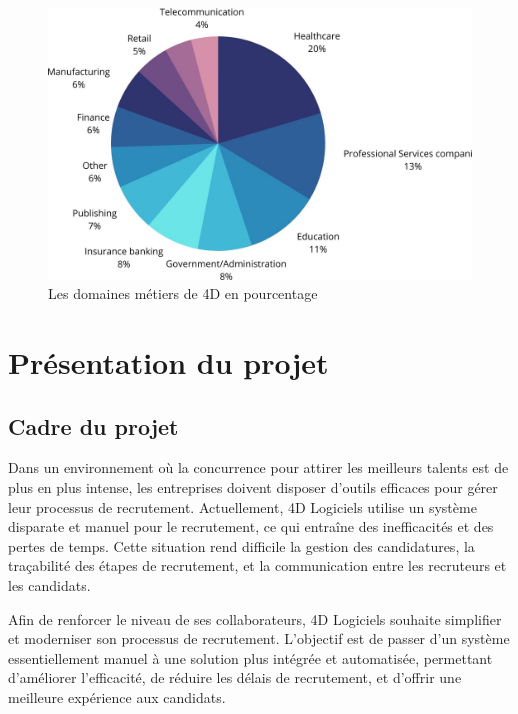 \begin{figure}[h]
    \centering
    \includegraphics[scale=0.3]{Images/domaineMetier.jpg} %
    \caption{Les domaines métiers de 4D en pourcentage}
    \label{fig:domaineMetier}
\end{figure}



\section{Présentation du projet}
\subsection{Cadre du projet}
Dans un environnement où la concurrence pour attirer les meilleurs talents
 est de plus en plus intense, les entreprises doivent disposer d'outils 
 efficaces pour gérer leur processus de recrutement. Actuellement, 
 4D Logiciels utilise un système disparate et manuel pour le recrutement, 
 ce qui entraîne des inefficacités et des pertes de temps. Cette situation 
 rend difficile la gestion des candidatures, la traçabilité des étapes de 
 recrutement, et la communication entre les recruteurs et les candidats.

Afin de renforcer le niveau de ses collaborateurs, 4D Logiciels souhaite 
simplifier et moderniser son processus de recrutement. L'objectif est de passer 
d'un système essentiellement manuel à une solution plus intégrée et automatisée, 
permettant d'améliorer l'efficacité, de réduire les délais de recrutement, 
et d'offrir une meilleure expérience aux candidats.

